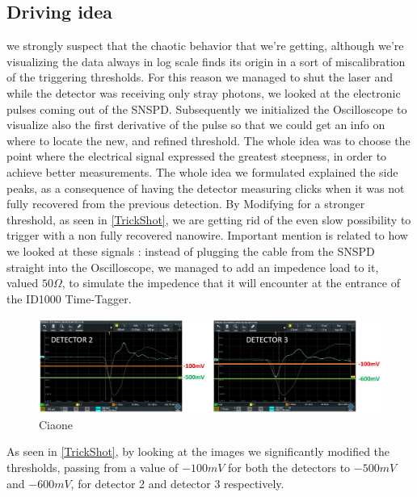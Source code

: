 \subsection{Driving idea}
we strongly suspect that the chaotic behavior that we're getting, although we're visualizing the data always in log scale finds its origin in a sort of miscalibration of the triggering thresholds.
For this reason we managed to shut the laser and while the detector was receiving only stray photons, we looked at the electronic pulses coming out of the SNSPD.
Subsequently we initialized the Oscilloscope to visualize also the first derivative of the pulse so that we could get an info on where to locate the new, and refined threshold. The whole idea was to choose the point where the electrical signal expressed the greatest steepness, in order to achieve better measurements.
The whole idea we formulated explained the side peaks, as a consequence of having the detector measuring clicks when it was not fully recovered from the previous detection. By Modifying for a stronger threshold, as seen in \autoref{TrickShot}, we are getting rid of the even slow possibility to trigger with a non fully recovered nanowire.
Important mention is related to how we looked at these signals : instead of plugging the cable from the SNSPD straight into the Oscilloscope, we managed to add an impedence load to it, valued $50 \Omega$, to simulate the impedence that it will encounter at the entrance of the ID1000 Time-Tagger.

\begin{figure}[hbtp]
\centering
\includegraphics[width=1\textwidth]{ScopeShots.jpg}
\caption{Ciaone}
\label{TrickShot}
\end{figure}

As seen in \autoref{TrickShot}, by looking at the images we significantly modified the thresholds, passing from a value of $-100mV$ for both the detectors to $-500mV$ and $-600mV$, for detector 2 and detector 3 respectively.

